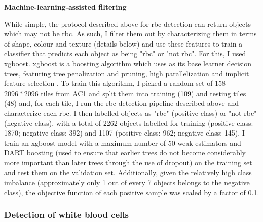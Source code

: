 \noindent \textbf{Machine-learning-assisted filtering}

While simple, the protocol described above for \ac{rbc} detection can return objects which may not be \ac{rbc}. As such, I filter them out by characterizing them in terms of shape, colour and texture (details below) and use these features to train a classifier that predicts each object as being "\ac{rbc}" or "not \ac{rbc}". For this, I used \ac{xgboost}. \ac{xgboost} is a boosting algorithm which uses as its base learner decision trees, featuring tree penalization and pruning, high parallelization and implicit feature selection \cite{Chen2016-xk}. To train this algorithm, I picked a random set of 158 $2096*2096$ tiles from AC1 and split them into training (109) and testing tiles (48) and, for each tile, I run the \ac{rbc} detection pipeline described above and characterize each \ac{rbc}. I then labelled objects as "\ac{rbc}" (positive class) or "not \ac{rbc}" (negative class), with a total of 2262 objects labelled for training (positive class: 1870; negative class: 392) and 1107 (positive class: 962; negative class: 145). I train an \ac{xgboost} model with a maximum number of 50 weak estimators and DART boosting (used to ensure that earlier trees do not become considerably more important than later trees through the use of dropout) \cite{Rashmi2015-qe} on the training set and test them on the validation set. Additionally, given the relatively high class imbalance (approximately only 1 out of every 7 objects belongs to the negative class), the objective function of each positive sample was scaled by a factor of 0.1.

\subsubsection{Detection of white blood cells}

